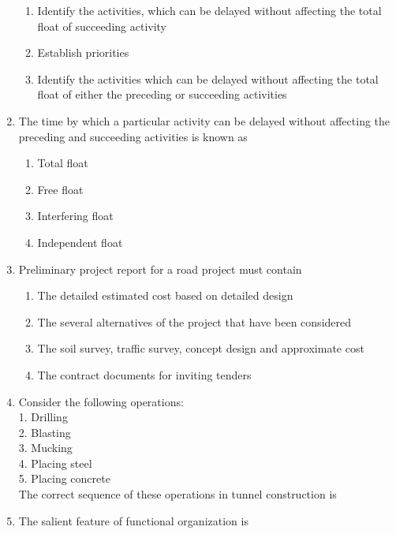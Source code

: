\documentclass[11pt,a4paper]{article}
\begin{document}
\begin{enumerate}
\begin{enumerate}[label=\Alph*.]
\item{Identify the activities, which can be delayed without affecting the total float of succeeding activity}
\item{Establish priorities}
\item{Identify the activities which can be delayed without affecting the total float of either the preceding or succeeding activities}
\end{enumerate}
\item{The time by which a particular activity can be delayed without affecting the preceding and succeeding activities is known as}
\begin{enumerate}[label=\Alph*.]
\item{Total float}
\item{Free float}
\item{Interfering float}
\item{Independent float}
\end{enumerate}
\item{Preliminary project report for a road project must contain}
\begin{enumerate}[label=\Alph*.]
\item{The detailed estimated cost based on detailed design}
\item{The several alternatives of the project that have been considered}
\item{The soil survey, traffic survey, concept design and approximate cost}
\item{The contract documents for inviting tenders}
\end{enumerate}
\item{Consider the following operations: \\
 1. Drilling \\
 2. Blasting \\
 3. Mucking \\
 4. Placing steel \\
 5. Placing concrete \\
 The correct sequence of these operations in tunnel construction is}
\\
\item{The salient feature of functional organization is}

\end{enumerate}
\end{document}

